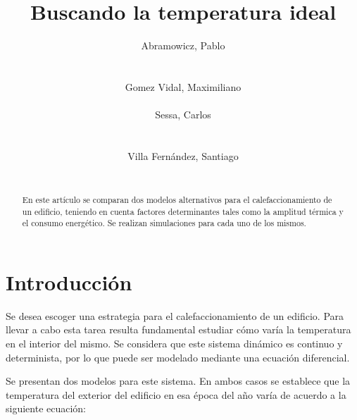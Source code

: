 \documentclass{sig-alternate}
\begin{document}

\title{Buscando la temperatura ideal}


\author{
    \alignauthor
    Abramowicz, Pablo\\
     \\
    \ \\
    Gomez Vidal, Maximiliano\\
     \\
    \alignauthor
    Sessa, Carlos\\
     \\
    \ \\
    Villa Fern\'{a}ndez, Santiago\\
     \\
}

\maketitle

\begin{abstract}
En este art\'{i}culo se comparan dos modelos alternativos para el 
calefaccionamiento de un edificio, teniendo en cuenta factores determinantes 
tales como la amplitud t\'{e}rmica y el consumo energ\'{e}tico. Se realizan 
simulaciones para cada uno de los mismos.
\end{abstract}


\section{Introducci\'{o}n}\label{introduccion}

Se desea escoger una estrategia para el calefaccionamiento de un
edificio. Para llevar a cabo esta tarea resulta fundamental estudiar c\'{o}mo 
var\'{i}a la temperatura en el interior del mismo. Se considera que este sistema 
din\'{a}mico es continuo y determinista, por lo que puede ser modelado mediante 
una ecuaci\'{o}n diferencial.

Se presentan dos modelos para este sistema. En ambos casos se establece que
la temperatura del exterior del edificio en esa \'{e}poca del a\~{n}o
var\'{i}a de acuerdo a la siguiente ecuaci\'{o}n:
\end{document}
